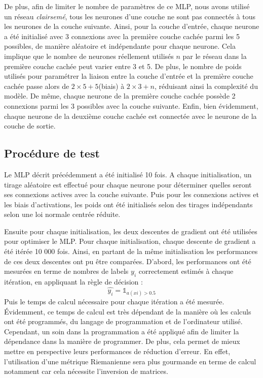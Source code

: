\documentclass{article}
\theoremstyle{definition}
\begin{document}
De plus, afin de limiter le nombre de paramètres de ce MLP, nous avons utilisé un réseau \textit{clairsemé}, tous les neurones d'une couche ne sont pas connectés à tous les neurones de la couche suivante. Ainsi, pour la couche d'entrée, chaque neurone a été initialisé avec 3 connexions avec la première couche cachée parmi les 5 possibles, de manière aléatoire et indépendante pour chaque neurone. Cela implique que le nombre de neurones réellement utilisés $n$ par le réseau dans la première couche cachée peut varier entre 3 et 5. De plus, le nombre de poids utilisés pour paramétrer la liaison entre la couche d'entrée et la première couche cachée passe alors de $2\times 5 + 5$(biais) à $2\times 3 + n$, réduisant ainsi la complexité du modèle.
De même, chaque neurone de la première couche cachée possède 2 connexions parmi les 3 possibles avec la couche suivante. Enfin, bien évidemment, chaque neurone de la deuxième couche cachée est connectée avec le neurone de la couche de sortie.\\

\subsection{Procédure de test}

Le MLP décrit précédemment a été initialisé 10 fois. A chaque initialisation, un tirage aléatoire est effectué pour chaque neurone pour déterminer quelles seront ses connexions actives avec la couche suivante. Puis pour les connexions actives et les biais d'activations, les poids ont été initialisés selon des tirages indépendants selon une loi normale centrée réduite.

Ensuite pour chaque initialisation, les deux descentes de gradient ont été utilisées pour optimiser le MLP. Pour chaque initialisation, chaque descente de gradient a été itérée 10 000 fois. Ainsi, en partant de la même initialisation les performances de ces deux descentes ont pu être comparées.  
 D'abord, les performances ont été mesurées en terme de nombres de labels $y_i$ correctement estimés à chaque itération, en appliquant la règle de décision : 
$$\hat{y_i}=\mathds{1}_{a(xi)>0.5}$$
Puis le temps de calcul nécessaire pour chaque itération a été mesurée. Évidemment, ce temps de calcul est très dépendant de la manière où les calculs ont été programmés, du langage de programmation et de l'ordinateur utilisé. Cependant, un soin dans la programmation a été appliqué afin de limiter la dépendance dans la manière de programmer. De plus, cela permet de mieux mettre en perspective leurs performances de réduction d'erreur. En effet, l'utilisation d'une métrique Riemanienne sera plus gourmande en terme de calcul notamment car cela nécessite l'inversion de matrices.
\end{document}
